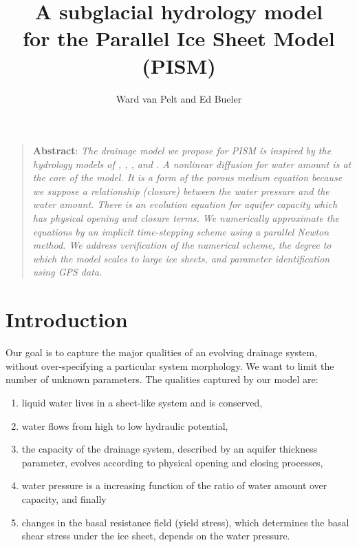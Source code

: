 \documentclass[11pt]{amsart}
\title[PISM hydrology model]{A subglacial hydrology model \\for the Parallel Ice Sheet Model (PISM)}
\author[van Pelt and Bueler]{Ward van Pelt and Ed Bueler}
\begin{document}
\maketitle

\begin{quote}
\textbf{Abstract}:  \emph{The drainage model we propose for PISM is inspired by the hydrology models of \emph{\citet{FlowersClarke2002_theory}},  \emph{\cite{Schoofmeltsupply}}, \emph{\citet{PimentelFlowers2011}}, and \emph{\citet{Hewitt2011}}.  A nonlinear diffusion for water amount is at the core of the model.  It is a form of the porous medium equation because we suppose a relationship (closure) between the water pressure and the water amount.  There is an evolution equation for aquifer capacity which has physical opening and closure terms. We numerically approximate the equations by an implicit time-stepping scheme using a parallel Newton method.  We address verification of the numerical scheme, the degree to which the model scales to large ice sheets, and parameter identification using GPS data.}
\end{quote}

\thispagestyle{empty}
\medskip

\section{Introduction}

Our goal is to capture the major qualities of an evolving drainage system, without over-specifying a particular system morphology.  We want to limit the number of unknown parameters.  The qualities captured by our model are:
\renewcommand{\labelenumi}{\emph{(\roman{enumi})}\quad}
\begin{enumerate}
\item liquid water lives in a sheet-like system and is conserved,
\item water flows from high to low hydraulic potential,
\item the capacity of the drainage system, described by an aquifer thickness parameter, evolves according to physical opening and closing processes,
\item water pressure is a increasing function of the ratio of water amount over capacity, and finally
\item changes in the basal resistance field (yield stress), which determines the basal shear stress under the ice sheet, depends on the water pressure.
\end{enumerate}
\end{document}
